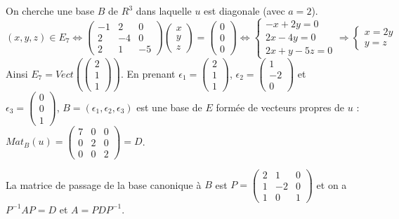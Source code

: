 \documentclass[a4paper,10pt]{book} %
\begin{document}
On cherche une base $B$ de $R^3$ dans laquelle $u$ est diagonale (avec $a=2$).\\
$(x,y,z)\in E_7\Leftrightarrow \begin{pmatrix}
-1&2&0\\2&-4&0\\2&1&-5
\end{pmatrix}\begin{pmatrix}
x\\y\\z
\end{pmatrix}=\begin{pmatrix}
0\\0\\0
\end{pmatrix}
\Leftrightarrow\left\{\begin{array}{c}
-x+2y=0\\2x-4y=0\\2x+y-5z=0
\end{array}\right. \Rightarrow
\left\{\begin{array}{c}
x=2y\\y=z
\end{array}\right.$\\

Ainsi $E_7=Vect(\begin{pmatrix}
2\\1\\1
\end{pmatrix})$.
En prenant $\epsilon_1=\begin{pmatrix}
2\\1\\1
\end{pmatrix}$, $\epsilon_2=\begin{pmatrix}
1\\-2\\0
\end{pmatrix}$ et $\epsilon_3=\begin{pmatrix}
0\\0\\1
\end{pmatrix}$, $B=(\epsilon_1,\epsilon_2,\epsilon_3)$ est une base de $E$ formée de vecteurs propres de $u$ : $Mat_B(u)=\begin{pmatrix}
7&0&0\\0&2&0\\0&0&2\end{pmatrix}=D$.

La matrice de passage de la base canonique à $B$ est $P=\begin{pmatrix}
2&1&0\\1&-2&0\\1&0&1
\end{pmatrix}$ et on a $P^{-1}AP=D$ et $A=PDP^{-1}$.
\end{document}
